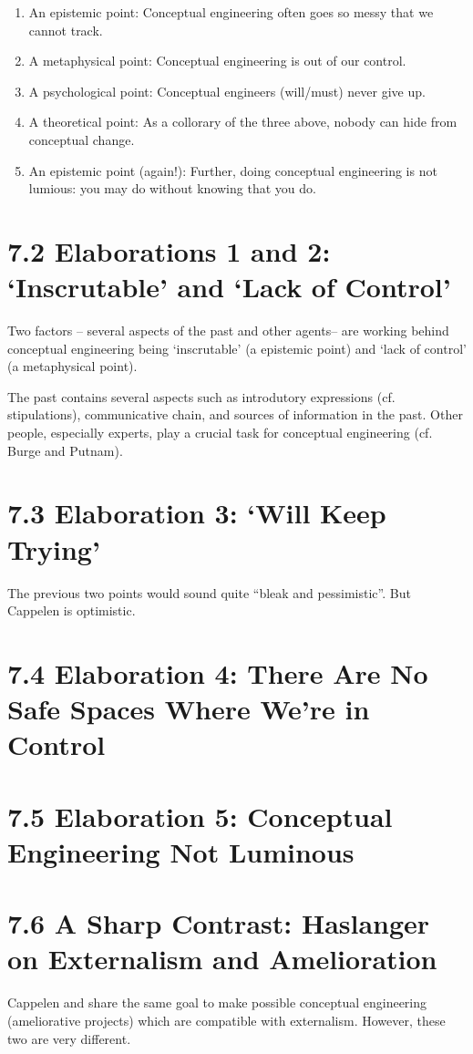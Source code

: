 \documentclass[
10pt, %
a4paper, %
twocolumn, %
landscape %
]{article}
\begin{document}
\begin{enumerate}
  \item An epistemic point: Conceptual engineering often goes so messy that we cannot track.
  \item A metaphysical point: Conceptual engineering is out of our control.
  \item A psychological point: Conceptual engineers (will/must) never give up.
  \item A theoretical point: As a collorary of the three above, nobody can hide from conceptual change.
  \item An epistemic point (again!): Further, doing conceptual engineering is not lumious: you may do without knowing that you do.
\end{enumerate}

\section*{7.2 Elaborations 1 and 2: `Inscrutable' and `Lack of Control'}

Two factors -- several aspects of the past and other agents-- are working behind conceptual engineering being `inscrutable' (a epistemic point) and `lack of control' (a metaphysical point).

The past contains several aspects such as introdutory expressions (cf. stipulations), communicative chain, and sources of information in the past.
Other people, especially experts, play a crucial task for conceptual engineering (cf. Burge and Putnam).

\section*{7.3 Elaboration 3: `Will Keep Trying'}
The previous two points would sound quite ``bleak and pessimistic''. But Cappelen is optimistic.

\section*{7.4 Elaboration 4: There Are No Safe Spaces Where We're in Control}

\section*{7.5 Elaboration 5: Conceptual Engineering Not Luminous}

\section*{7.6 A Sharp Contrast: Haslanger on Externalism and Amelioration}
Cappelen and \cite{Haslanger2012} share the same goal to make possible conceptual engineering (ameliorative projects) which are compatible with externalism. However, these two are very different.
\end{document}
